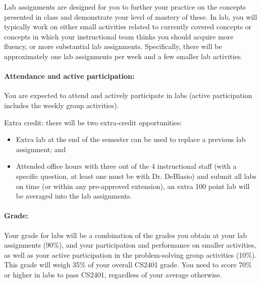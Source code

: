\documentclass[12pt]{scrartcl}
\begin{document}
Lab assignments are designed for you to further your practice on the concepts presented in class and demonstrate your level of mastery of these. 
In lab, you will typically work on either small activities related to currently covered concepts or concepts in which your instructional team thinks you should acquire more fluency, or more substantial lab assignments. 
Specifically, there will be approximately one lab assignments per week and a few smaller lab activities. 


\paragraph{Attendance and active participation:} You are expected to attend and actively participate in labs (active participation includes the weekly group activities). 

Extra credit: there will be two extra-credit opportunities: 
\begin{itemize}
\item Extra lab at the end of the semester can be used to replace a previous lab assignment; and 
\item Attended office hours with three out of the 4 instructional staff (with a specific question, at least one must be with Dr. DeBlasio) and submit all labs on time 
(or within any pre-approved extension), an extra 100 point lab will be averaged into the lab assignments.
\end{itemize}

\paragraph{Grade:} Your grade for labs will be a combination of the grades you obtain at your lab assignments (90\%), and
 your participation and performance on smaller activities, as well as your active participation in the problem-solving group activities (10\%). 
This grade will weigh 35\% of your overall CS2401 grade. 
You need to score 70\% or higher in labs to pass CS2401, regardless of your average otherwise.
\end{document}

